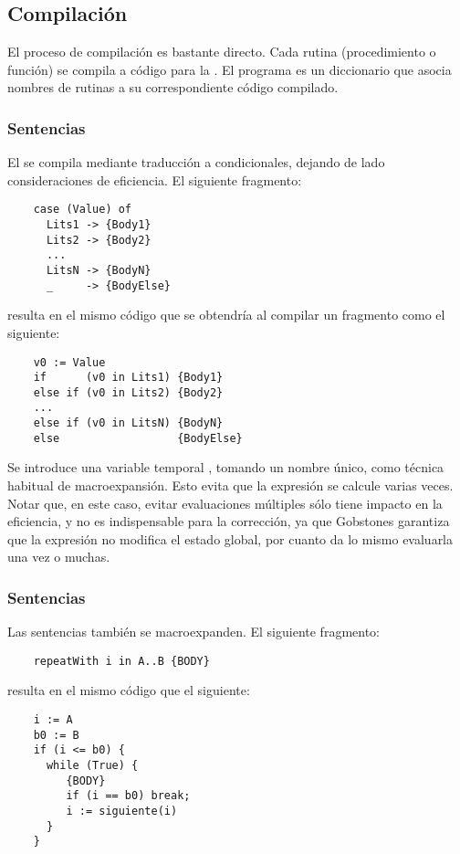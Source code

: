\documentclass{article}
\begin{document}
\subsection{Compilaci\'on}

El proceso de compilaci\'on es bastante directo.
Cada rutina (procedimiento o funci\'on) se compila a c\'odigo
para la \GVM. El programa es un diccionario que asocia nombres
de rutinas a su correspondiente c\'odigo compilado.

\subsubsection{Sentencias }

El  se compila mediante traducci\'on a condicionales,
dejando de lado consideraciones de eficiencia. El siguiente
fragmento:

\begin{verbatim}
    case (Value) of
      Lits1 -> {Body1}
      Lits2 -> {Body2}
      ...
      LitsN -> {BodyN}
      _     -> {BodyElse}
\end{verbatim}
resulta en el mismo c\'odigo que se obtendr\'ia al compilar
un fragmento como el siguiente:
\begin{verbatim}
    v0 := Value
    if      (v0 in Lits1) {Body1}
    else if (v0 in Lits2) {Body2}
    ...
    else if (v0 in LitsN) {BodyN}
    else                  {BodyElse}
\end{verbatim}
Se introduce una variable temporal ,
tomando un nombre \'unico, como t\'ecnica habitual de macroexpansi\'on.
Esto evita que la expresi\'on  se calcule varias veces.
Notar que, en este caso, evitar evaluaciones m\'ultiples
s\'olo tiene impacto en la eficiencia, y no es indispensable
para la correcci\'on, ya que Gobstones garantiza que la expresi\'on
 no modifica el estado global, por cuanto da lo
mismo evaluarla una vez o muchas.

\subsubsection{Sentencias }

Las sentencias  tambi\'en se macroexpanden.
El siguiente fragmento:
\begin{verbatim}
    repeatWith i in A..B {BODY}
\end{verbatim}
resulta en el mismo c\'odigo que el siguiente:
\begin{verbatim}
    i := A
    b0 := B
    if (i <= b0) {
      while (True) {
         {BODY}
         if (i == b0) break;
         i := siguiente(i)
      }
    }
\end{verbatim}
\end{document}

